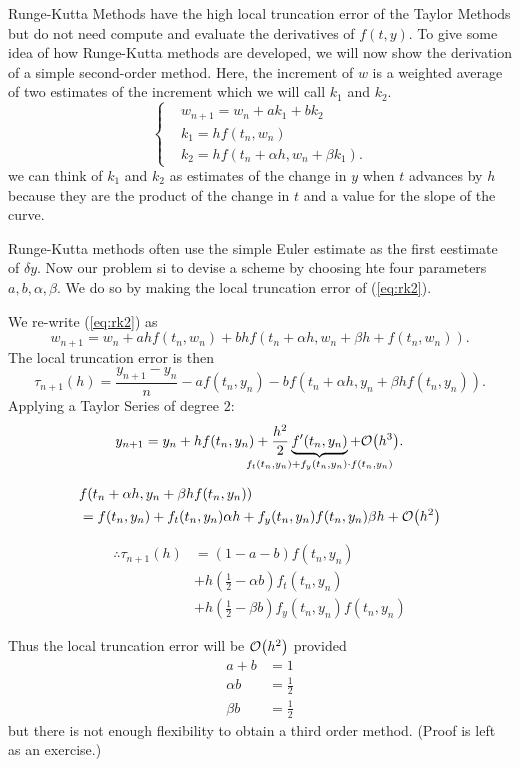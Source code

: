 \documentclass[12pt]{article}
\begin{document}
Runge-Kutta Methods have the high local truncation error of the Taylor Methods
but do not need compute and evaluate the derivatives of $f(t,y)$. To give some
idea of how Runge-Kutta methods are developed, we will now show the derivation
of a simple second-order method. Here, the increment of $w$ is a weighted
average of two estimates of the increment which we will call $k_1$ and $k_2$.
\[
\begin{cases}
  & w_{n+1} = w_n + ak_1 + bk_2 \\
  & k_1 = hf(t_n, w_n) \\
  & k_2 = hf(t_n + \alpha h, w_n + \beta k_1)
.\end{cases}
\label{eq:rk2}
\]
we can think of $k_1$ and $k_2$ as estimates of the change in $y$ when $t$
advances by $h$ because they are the product of the change in $t$ and a value
for the slope of the curve.

Runge-Kutta methods often use the simple Euler estimate as the first eestimate
of $\delta y$. Now our problem si to devise a scheme by choosing hte four
parameters $a, b, \alpha, \beta$. We do so by making the local truncation error
of (\ref{eq:rk2}).

We re-write (\ref{eq:rk2}) as
\[
  w_{n+1} = w_n + ahf(t_n, w_n) + bhf(t_n+\alpha h, w_n+\beta h + f(t_n, w_n))
.\]
The local truncation error is then
\[
  \tau_{n+1}(h) = \frac{y_{n+1}-y_n}{n} - af(t_n,y_n) - bf(t_n+\alpha h, y_n +
  \beta hf(t_n, y_n))
.\]
Applying a Taylor Series of degree $2$:
\[
  y_{n+1} = y_n + h f(t_n, y_n) + \frac{h^2}{2} 
  \underbrace{f'(t_n, y_n)}_{\mathclap{f_t(t_n, y_n) + f_y(t_n, y_n) \cdot f(t_n, y_n)}} 
  + \order{h^3}.
\]

\begin{align*}
& f(t_n + \alpha h, y_n + \beta h f(t_n,y_n))  \\
&= f(t_n, y_n) + f_t(t_n,y_n) \alpha h + f_y(t_n, y_n) f(t_n,y_n) \beta h + 
\order{h^2} \\
\end{align*}

\begin{align*}
  \therefore \tau_{n+1} (h) &= (1-a-b) f(t_n,y_n) \\
                            &+ h(\frac{1}{2} -\alpha b) f_t(t_n,y_n) \\
                            &+ h(\frac{1}{2} - \beta b) f_y(t_n,y_n) f(t_n,y_n)
\end{align*}

Thus the local truncation error will be $\order{h^2}$ provided 
\begin{align*}
a+b &= 1 \\
\alpha b &= \frac{1}{2} \\
\beta b &= \frac{1}{2}
\end{align*}
but there is not enough flexibility to obtain a third order method. (Proof is
left as an exercise.)
\end{document}

